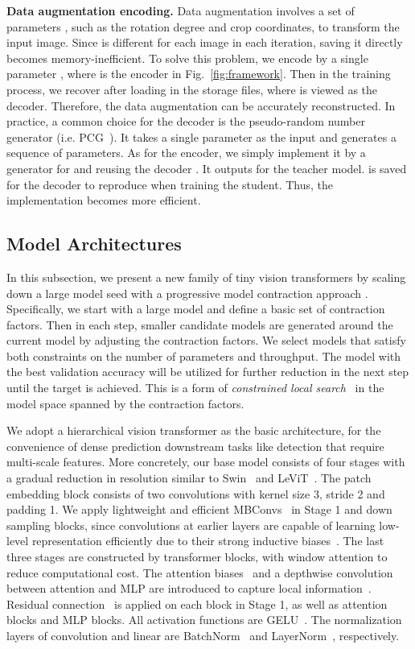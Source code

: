 \documentclass[runningheads]{llncs}
\newcommand\REV[1]{#1}
\begin{document}
\textbf{Data augmentation encoding.}
Data augmentation involves a set of parameters , such as the rotation degree and crop coordinates, to transform the input image. Since  is different for each image in each iteration, saving it directly becomes memory-inefficient. To solve this problem, we encode  by a single parameter , where  is the encoder in Fig.~\ref{fig:framework}. Then in the training process, we recover  after loading  in the storage files, where  is viewed as the decoder. Therefore, the data augmentation can be accurately reconstructed. In practice, a common choice for the decoder is the pseudo-random number generator (i.e. PCG~\cite{pcg}). It takes a single parameter as the input and generates a sequence of parameters. As for the encoder, we simply implement it by a generator for  and reusing the decoder . It outputs  for the teacher model.  is saved for the decoder to reproduce  when training the student. Thus, the implementation becomes more efficient.

\vspace{-4mm}
\subsection{Model Architectures}
\label{sec: dsp}

In this subsection, we present a new family of tiny vision transformers by scaling down a large model seed with a  progressive model contraction approach \cite{x3d}. 
Specifically, we start with a large model and define a basic set of contraction factors. Then in each step, smaller candidate models are generated around the current model by adjusting the contraction factors.  We select models that satisfy both constraints on the number of parameters and throughput. The model with \REV{the best validation accuracy} will be utilized for further reduction in the next step until the target is achieved. This is a form of \textit{constrained local search}~\cite{localsearch} in the model space spanned by the contraction factors. 

\REV{We adopt a hierarchical vision transformer as the basic architecture, for the convenience of dense prediction downstream tasks like detection that require multi-scale features. More concretely, our base model consists of four stages with a gradual reduction in resolution similar to Swin~\cite{swin} and LeViT~\cite{levit}. The patch embedding block consists of two convolutions with kernel size 3, stride 2 and padding 1. We apply lightweight and efficient MBConvs~\cite{mobilenetv3} in Stage 1 and down sampling blocks, since convolutions at earlier layers are capable of learning low-level representation efficiently due to their strong inductive biases~\cite{levit,early_conv}. The last three stages are constructed by transformer blocks, with window attention to reduce computational cost. The attention biases~\cite{levit} and a  depthwise convolution between attention and MLP are introduced to capture local information~\cite{irpe,chu2021conditional}. Residual connection~\cite{resnet} is applied on each block in Stage 1, as well as attention blocks and MLP blocks. All activation functions are GELU~\cite{gelu}. The normalization layers of convolution and linear are BatchNorm~\cite{BN} and LayerNorm~\cite{LN}, respectively.}
\end{document}
